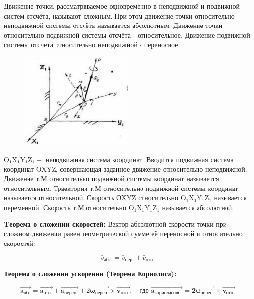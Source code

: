 Движение точки, рассматриваемое одновременно в неподвижной и подвижной систем отсчёта, называют сложным. При этом движение точки относительно неподвижной системы отсчёта называется абсолютным. Движение точки относительно подвижной системы отсчёта - относительное. Движение подвижной системы отсчета относительно неподвижной - переносное.



\begin{figure}[h!]
    \centering
    \includegraphics[width=0.5\textwidth]{2023_05_21_6e9b4e8657e82b213c6ag-07}
\end{figure}


$\mathrm{O}_{1} \mathrm{X}_{1} \mathrm{Y}_{1} \mathrm{Z}_{1}-$ неподвижная система координат. Вводится подвижная система координат OXYZ, совершающая заданное движение относительно неподвижной. Движение т.М относительно подвижной системы координат называется относительным. Траектории т.М относительно подвижной системы координат называется относительной. Скорость ОXYZ относительно $\mathrm{O}_{1} \mathrm{X}_{1} \mathrm{Y}_{1} \mathrm{Z}_{1}$ называется переменной. Скорость т.М относительно $\mathrm{O}_{1} \mathrm{X}_{1} \mathrm{Y}_{1} \mathrm{Z}_{1}$ называется абсолютной.

\textbf{Tеорема о сложении скоростей:} Вектор абсолютной скорости точки при сложном движении равен геометрической сумме её переносной и относительно скоростей:

$$
\bar{v}_{\text {абс }}=\bar{v}_{\text {пер }}+\bar{v}_{\text {отн }}
$$

\textbf{Теорема о сложении ускорений (Теорема Кориолиса):}


$$
\overrightarrow{\mathrm{a}_{\mathrm{aбc}}}=\overrightarrow{\mathrm{a}_{\text {отн }}}+\overrightarrow{\mathrm{a}_{\text {перен }}}+2 \overrightarrow{\boldsymbol{\omega}_{\text {перен }}} \times \overrightarrow{\boldsymbol{v}_{\text {отн }}}, \quad
\text{где } \overrightarrow{\mathrm{a}_{\text {кориолисово }}}=\mathbf{2} \overrightarrow{\boldsymbol{\omega}_{\text {перен }}} \times \overrightarrow{\boldsymbol{v}_{\text {отн }}}
$$


